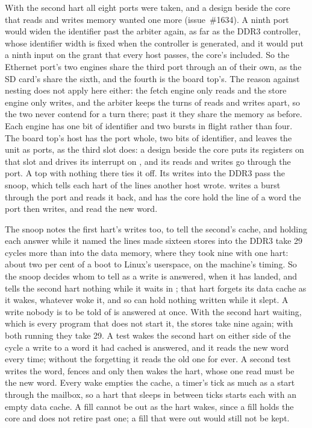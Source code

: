 \documentclass[journal,onecolumn,9pt]{IEEEtran}
\begin{document}
With the second hart all eight ports were taken, and a design beside
the core that reads and writes memory wanted one more (issue~\#1634).
A ninth port would widen the identifier past the arbiter again, as
far as the DDR3 controller, whose identifier width is fixed when the
controller is generated, and it would put a ninth input on the grant
that every host passes, the core's included. So the Ethernet port's
two engines share the third port through an  of their
own, as the SD card's share the sixth, and the fourth is the board
top's. The reason against nesting does not apply here either: the
fetch engine only reads and the store engine only writes, and the
arbiter keeps the turns of reads and writes apart, so the two never
contend for a turn there; past it they share the memory as before. Each engine has one bit of identifier and two bursts
in flight rather than four. The board top's host has the port whole,
two bits of identifier, and leaves the unit as ports, as the third
slot does: a design beside the core puts its registers on that slot and
drives its interrupt on , and its reads and writes go
through the port. A top with nothing there ties it off. Its writes into the DDR3 pass the
snoop, which tells each hart of the lines another host wrote.
 writes a
burst through the port and reads it back, and
 has the core hold the
line of a word the port then writes, and read the new word.

The snoop notes the first hart's writes too, to tell the second's
cache, and holding each answer while it named the lines made sixteen
stores into the DDR3 take 29 cycles more than into the data memory,
where they took nine with one hart: about two per cent of a boot to
Linux's userspace, on the machine's timing. So the snoop decides whom
to tell as a write is answered, when it has landed, and tells the
second hart nothing while it waits in ; that hart forgets
its data cache as it wakes, whatever woke it, and so can hold nothing
written while it slept. A write nobody is to be told of is answered
at once. With the second hart waiting, which is every program that
does not start it, the stores take nine again; with both running they
take 29. A test wakes the second hart on either side of the cycle a
write to a word it had cached is answered, and it reads the new word
every time; without the forgetting it reads the old one for ever.
A second test writes the word, fences and only then wakes the hart,
whose one read must be the new word. Every wake empties the cache, a timer's
tick as much as a start through the mailbox, so a hart that sleeps in
 between ticks starts each with an empty data cache. A fill
cannot be out as the hart wakes, since a fill holds the core and
 does not retire past one; a fill that were out would still
not be kept.
\end{document}
